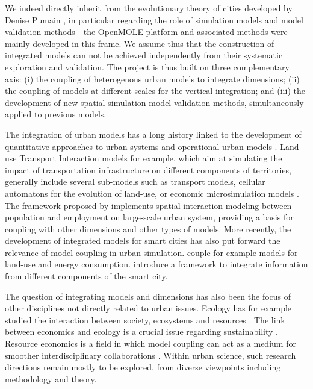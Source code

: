 We indeed directly inherit from the evolutionary theory of cities developed by Denise Pumain \cite{pumain2017urban}, in particular regarding the role of simulation models and model validation methods - the OpenMOLE platform and associated methods \cite{reuillon2013openmole} were mainly developed in this frame. We assume thus that the construction of integrated models can not be achieved independently from their systematic exploration and validation. The project is thus built on three complementary axis: (i) the coupling of heterogenous urban models to integrate dimensions; (ii) the coupling of models at different scales for the vertical integration; and (iii) the development of new spatial simulation model validation methods, simultaneously applied to previous models.

The integration of urban models has a long history linked to the development of quantitative approaches to urban systems and operational urban models \cite{batty2021defining}. Land-use Transport Interaction models for example, which aim at simulating the impact of transportation infrastructure on different components of territories, generally include several sub-models such as transport models, cellular automatons for the evolution of land-use, or economic microsimulation models \cite{wegener2021land}. The framework proposed by \cite{batty2021new} implements spatial interaction modeling between population and employment on large-scale urban system, providing a basis for coupling with other dimensions and other types of models. More recently, the development of integrated models for smart cities has also put forward the relevance of model coupling in urban simulation. \cite{yamagata2013simulating} couple for example models for land-use and energy consumption. \cite{muvuna2019methodology} introduce a framework to integrate information from different components of the smart city.

The question of integrating models and dimensions has also been the focus of other disciplines not directly related to urban issues. Ecology has for example studied the interaction between society, ecosystems and resources \cite{bithell2009coupling}. The link between economics and ecology is a crucial issue regarding sustainability \cite{hofkes1996modelling}. Resource economics is a field in which model coupling can act as a medium for smoother interdisciplinary collaborations \cite{macleod2016model}. Within urban science, such research directions remain mostly to be explored, from diverse viewpoints including methodology and theory.


